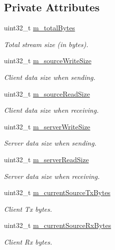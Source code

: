 \subsection*{Private Attributes}
\begin{DoxyCompactItemize}
\item 
uint32\+\_\+t \hyperlink{classTcpTestCase_a9b4497e157a0b1fb7fdf90e833696201}{m\+\_\+total\+Bytes}
\begin{DoxyCompactList}\small\item\em Total stream size (in bytes). \end{DoxyCompactList}\item 
uint32\+\_\+t \hyperlink{classTcpTestCase_af2488464ac4a6aa734ab2fa3a8f1255e}{m\+\_\+source\+Write\+Size}
\begin{DoxyCompactList}\small\item\em Client data size when sending. \end{DoxyCompactList}\item 
uint32\+\_\+t \hyperlink{classTcpTestCase_a9c310cf24127d169c4d40af57de54e3b}{m\+\_\+source\+Read\+Size}
\begin{DoxyCompactList}\small\item\em Client data size when receiving. \end{DoxyCompactList}\item 
uint32\+\_\+t \hyperlink{classTcpTestCase_adc7913a86c86cc101b620d153b7b1af9}{m\+\_\+server\+Write\+Size}
\begin{DoxyCompactList}\small\item\em Server data size when sending. \end{DoxyCompactList}\item 
uint32\+\_\+t \hyperlink{classTcpTestCase_a0487d4363885a37e702f1d6576435f0f}{m\+\_\+server\+Read\+Size}
\begin{DoxyCompactList}\small\item\em Server data size when receiving. \end{DoxyCompactList}\item 
uint32\+\_\+t \hyperlink{classTcpTestCase_a41135a441155aab8e7d80acdf7c1a959}{m\+\_\+current\+Source\+Tx\+Bytes}
\begin{DoxyCompactList}\small\item\em Client Tx bytes. \end{DoxyCompactList}\item 
uint32\+\_\+t \hyperlink{classTcpTestCase_a955064e2af5b339a49a3aa3a04f166f8}{m\+\_\+current\+Source\+Rx\+Bytes}
\begin{DoxyCompactList}\small\item\em Client Rx bytes. \end{DoxyCompactList}\item 

\end{DoxyCompactItemize}
